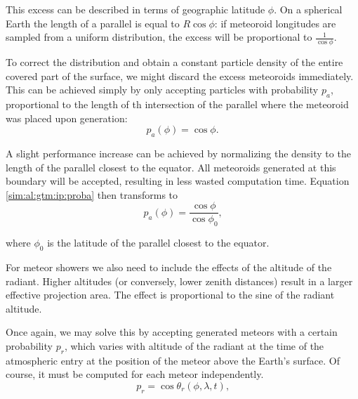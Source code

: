             This excess can be described in terms of geographic latitude $\phi$. On a spherical Earth
            the length of a parallel is equal to $R \cos{\phi}$: if meteoroid longitudes are sampled
            from a uniform distribution, the excess will be proportional to $\frac{1}{\cos\phi}$.
            
            To correct the distribution and obtain a constant particle density of the entire covered part
            of the surface, we might discard the excess meteoroids immediately. This can be achieved simply
            by only accepting particles with probability $p_a$, proportional to the length of th intersection
            of the parallel where the meteoroid was placed upon generation:
            \begin{equation}
                p_a(\phi) = \cos\phi\text{.}
                \label{sim:al:gtm:ip:proba}
            \end{equation}
            
            A slight performance increase can be achieved by normalizing the density to the
            length of the parallel closest to the equator. All meteoroids generated at this boundary will be accepted,
            resulting in less wasted computation time.
            Equation \ref{sim:al:gtm:ip:proba} then transforms to
            \begin{equation}
                p_a(\phi) = \frac{\cos\phi}{\cos\phi_0}\text{,}
                \label{sim:al:gtm:ip:prob2}
            \end{equation}

            where $\phi_0$ is the latitude of the parallel closest to the equator.
            
            For meteor showers we also need to include the effects of the altitude of the radiant.
            Higher altitudes (or conversely, lower zenith distances) result in a larger effective projection area.
            The effect is proportional to the sine of the radiant altitude.
            
            Once again, we may solve this by accepting generated meteors with a certain probability $p_r$,
            which varies with altitude of the radiant at the time of the atmospheric entry at
            the position of the meteor above the Earth's surface.
            Of course, it must be computed for each meteor independently.
            \begin{equation}
                p_r = \cos\theta_r(\phi, \lambda, t)\text{,} 
                \label{sim:al:gtm:ip:probr}
            \end{equation}
            
